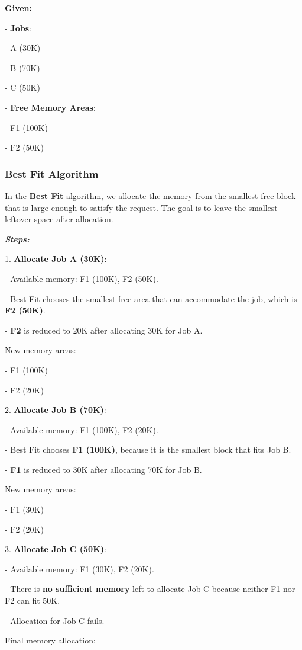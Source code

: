 \documentclass[a4paper]{book}
\begin{document}
\textbf{Given:}

- \textbf{Jobs}:

  - A (30K)
  
  - B (70K)
  
  - C (50K)
  
- \textbf{Free Memory Areas}:

  - F1 (100K)
  
  - F2 (50K)

\subsubsection{Best Fit Algorithm}

In the \textbf{Best Fit} algorithm, we allocate the memory from the smallest free block that is large enough to satisfy the request. The goal is to leave the smallest leftover space after allocation.

\textit{\textbf{Steps:}}

1. \textbf{Allocate Job A (30K)}:

   - Available memory: F1 (100K), F2 (50K).
   
   - Best Fit chooses the smallest free area that can accommodate the job, which is \textbf{F2 (50K)}.
   
   - \textbf{F2} is reduced to 20K after allocating 30K for Job A.

   New memory areas:
   
   - F1 (100K)
   
   - F2 (20K)

2. \textbf{Allocate Job B (70K)}:

   - Available memory: F1 (100K), F2 (20K).
   
   - Best Fit chooses \textbf{F1 (100K)}, because it is the smallest block that fits Job B.
   
   - \textbf{F1} is reduced to 30K after allocating 70K for Job B.

   New memory areas:
   
   - F1 (30K)
   
   - F2 (20K)

3. \textbf{Allocate Job C (50K)}:

   - Available memory: F1 (30K), F2 (20K).
   
   - There is \textbf{no sufficient memory} left to allocate Job C because neither F1 nor F2 can fit 50K.
   
   - Allocation for Job C fails.

   Final memory allocation:
   
\end{document}
